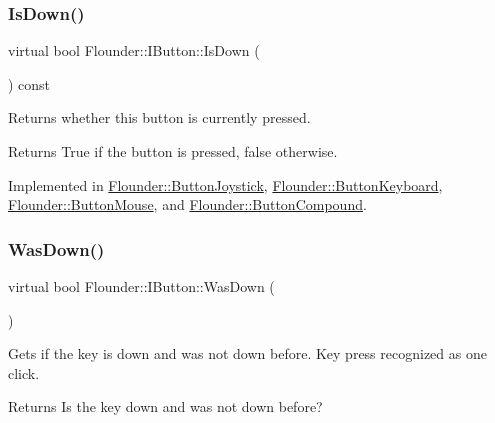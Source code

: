 \subsubsection{\texorpdfstring{Is\+Down()}{IsDown()}}
{\footnotesize\ttfamily virtual bool Flounder\+::\+I\+Button\+::\+Is\+Down (\begin{DoxyParamCaption}{ }\end{DoxyParamCaption}) const\hspace{0.3cm}{\ttfamily [pure virtual]}}



Returns whether this button is currently pressed. 

\begin{DoxyReturn}{Returns}
True if the button is pressed, false otherwise. 
\end{DoxyReturn}


Implemented in \hyperlink{class_flounder_1_1_button_joystick_a32a08c87ecd633ff96fca32ff2d992b0}{Flounder\+::\+Button\+Joystick}, \hyperlink{class_flounder_1_1_button_keyboard_aa90e1ba336eea1bf4cecd4ed7def7a02}{Flounder\+::\+Button\+Keyboard}, \hyperlink{class_flounder_1_1_button_mouse_aae2c553f4d3dabf948a5c6b6dd3b3c28}{Flounder\+::\+Button\+Mouse}, and \hyperlink{class_flounder_1_1_button_compound_a168866bc6410f111f9c8a98b1ec83dd6}{Flounder\+::\+Button\+Compound}.

\mbox{\label{class_flounder_1_1_i_button_af31c7669349991fe6a57beb8bd42c5b2}} 
\subsubsection{\texorpdfstring{Was\+Down()}{WasDown()}}
{\footnotesize\ttfamily virtual bool Flounder\+::\+I\+Button\+::\+Was\+Down (\begin{DoxyParamCaption}{ }\end{DoxyParamCaption})\hspace{0.3cm}{\ttfamily [pure virtual]}}



Gets if the key is down and was not down before. Key press recognized as one click. 

\begin{DoxyReturn}{Returns}
Is the key down and was not down before? 
\end{DoxyReturn}


